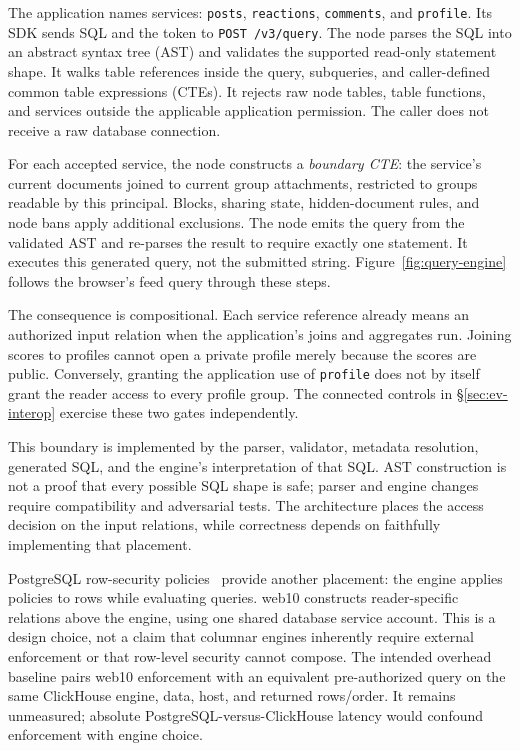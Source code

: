 \documentclass[sigconf, nonacm]{acmart}
\begin{document}
The application names services: \texttt{posts}, \texttt{reactions},
\texttt{comments}, and \texttt{profile}. Its SDK sends SQL and the token
to \texttt{POST /v3/query}. The node parses the SQL into an abstract
syntax tree (AST) and validates the supported read-only statement shape.
It walks table references inside the query, subqueries, and caller-defined
common table expressions (CTEs). It rejects raw node tables, table
functions, and services outside the applicable application permission.
The caller does not receive a raw database connection.

For each accepted service, the node constructs a \emph{boundary CTE}:
the service's current documents joined to current group attachments,
restricted to groups readable by this principal. Blocks, sharing state,
hidden-document rules, and node bans apply additional exclusions.
The node emits the query from the validated AST and re-parses the result
to require exactly one statement. It executes this generated query,
not the submitted string. Figure~\ref{fig:query-engine} follows the
browser's feed query through these steps.

The consequence is compositional. Each service reference already means
an authorized input relation when the application's joins and aggregates
run. Joining scores to profiles cannot open a private profile merely
because the scores are public. Conversely, granting the application use
of \texttt{profile} does not by itself grant the reader access to every
profile group. The connected controls in \S\ref{sec:ev-interop} exercise
these two gates independently.

This boundary is implemented by the parser, validator, metadata
resolution, generated SQL, and the engine's interpretation of that SQL.
AST construction is not a proof that every possible SQL shape is safe;
parser and engine changes require compatibility and adversarial tests.
The architecture places the access decision on the input relations,
while correctness depends on faithfully implementing that placement.

PostgreSQL row-security policies~\cite{postgres-rls} provide another
placement: the engine applies policies to rows while evaluating queries.
web10 constructs reader-specific relations above the engine, using one
shared database service account. This is a design choice, not a claim
that columnar engines inherently require external enforcement or that
row-level security cannot compose. The intended overhead baseline pairs
web10 enforcement with an equivalent pre-authorized query on the same
ClickHouse engine, data, host, and returned rows/order. It remains unmeasured;
absolute PostgreSQL-versus-ClickHouse latency would confound enforcement
with engine choice.
\end{document}
